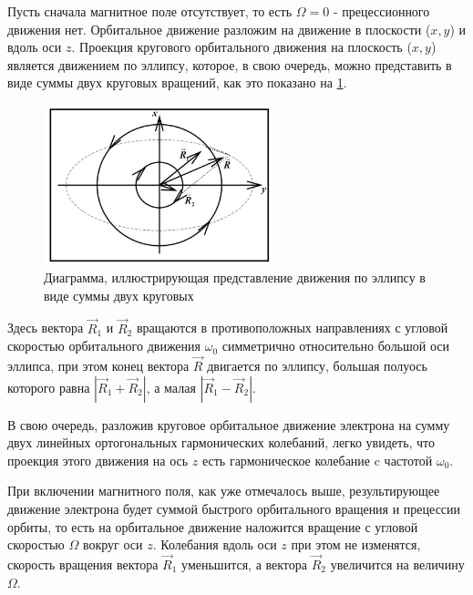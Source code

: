 Пусть сначала магнитное поле отсутствует, то есть $\Omega = 0$ - прецессионного движения нет. Орбитальное движение разложим на движение в плоскости ($x, y$) и вдоль оси $z$. Проекция кругового орбитального движения на плоскость ($x, y$) является движением по эллипсу, которое, в свою очередь, можно представить в виде суммы двух круговых вращений, как это показано на \ref{fig:5}. 

\begin{figure}
\begin{center}
\vspace{-10pt}
\includegraphics[width=0.6\textwidth]{fig/fig5.jpg}
\vspace{-35pt}
\end{center}
\caption{Диаграмма, иллюстрирующая представление движения по эллипсу в виде суммы двух круговых}
\label{fig:5}
\end{figure}

Здесь вектора $\vec{R}_1$ и $\vec{R}_2$ вращаются в противоположных направлениях с угловой скоростью орбитального движения $\omega_0$ симметрично относительно большой оси эллипса, при этом конец вектора $\vec{R}$ двигается по эллипсу, большая полуось которого равна $|\vec{R}_1 + \vec{R}_2|$, а малая $|\vec{R}_1 - \vec{R}_2|$.

В свою очередь, разложив круговое орбитальное движение электрона на сумму двух линейных ортогональных гармонических колебаний, легко увидеть, что проекция этого движения на ось $z$ есть гармоническое колебание c частотой $\omega_0$.

При включении магнитного поля, как уже отмечалось выше, результирующее движение электрона будет суммой быстрого орбитального вращения и прецессии орбиты, то есть на орбитальное движение наложится вращение с угловой скоростью $\Omega$ вокруг оси $z$. Колебания вдоль оси $z$ при этом не изменятся, скорость вращения вектора $\vec{R}_1$ уменьшится, а вектора $\vec{R}_2$ увеличится на величину $\Omega$. 

